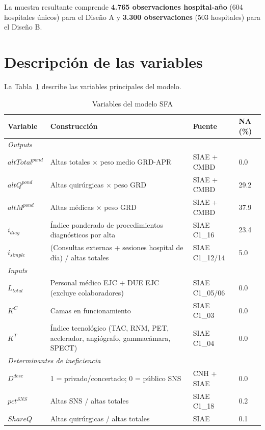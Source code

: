 \documentclass[12pt, a4paper, twoside, openright]{book}
\theoremstyle{plain}
\theoremstyle{definition}
\theoremstyle{remark}
\begin{document}
La muestra resultante comprende \textbf{4.765 observaciones hospital-año} (604 hospitales únicos) para el Diseño A y \textbf{3.300 observaciones} (503 hospitales) para el Diseño B.

\section{Descripción de las variables}
\label{sec:variables}

La Tabla~\ref{tab:variables} describe las variables principales del modelo.

\begin{table}[htbp]
\centering
\caption{Variables del modelo SFA}
\label{tab:variables}
\begin{threeparttable}
\small
\begin{tabular}{p{2.5cm}p{5cm}p{2.5cm}p{1.5cm}}
\toprule
\textbf{Variable} & \textbf{Construcción} &
\textbf{Fuente} & \textbf{NA (\%)} \\
\midrule
\multicolumn{4}{l}{\textit{Outputs}} \\
$altTotal^{pond}$ & Altas totales $\times$ peso medio GRD-APR & SIAE + CMBD & 0.0 \\
$altQ^{pond}$ & Altas quirúrgicas $\times$ peso GRD & SIAE + CMBD & 29.2 \\
$altM^{pond}$ & Altas médicas $\times$ peso GRD & SIAE + CMBD & 37.9 \\
$i_{diag}$ & Índice ponderado de procedimientos diagnósticos por alta & SIAE C1\_16 & 23.4 \\
$i_{simple}$ & (Consultas externas + sesiones hospital de día) / altas totales & SIAE C1\_12/14 & 5.0 \\[4pt]
\multicolumn{4}{l}{\textit{Inputs}} \\
$L_{total}$ & Personal médico EJC + DUE EJC (excluye colaboradores) & SIAE C1\_05/06 & 0.0 \\
$K^C$ & Camas en funcionamiento & SIAE C1\_03 & 0.0 \\
$K^T$ & Índice tecnológico (TAC, RNM, PET, acelerador, angiógrafo, gammacámara, SPECT) & SIAE C1\_04 & 0.0 \\[4pt]
\multicolumn{4}{l}{\textit{Determinantes de ineficiencia}} \\
$D^{desc}$ & 1 = privado/concertado; 0 = público SNS & CNH + SIAE & 0.0 \\
$pct^{SNS}$ & Altas SNS / altas totales & SIAE C1\_18 & 0.2 \\
$ShareQ$ & Altas quirúrgicas / altas totales & SIAE & 0.1 \\[4pt]

\end{tabular}
\end{threeparttable}
\end{table}
\end{document}
